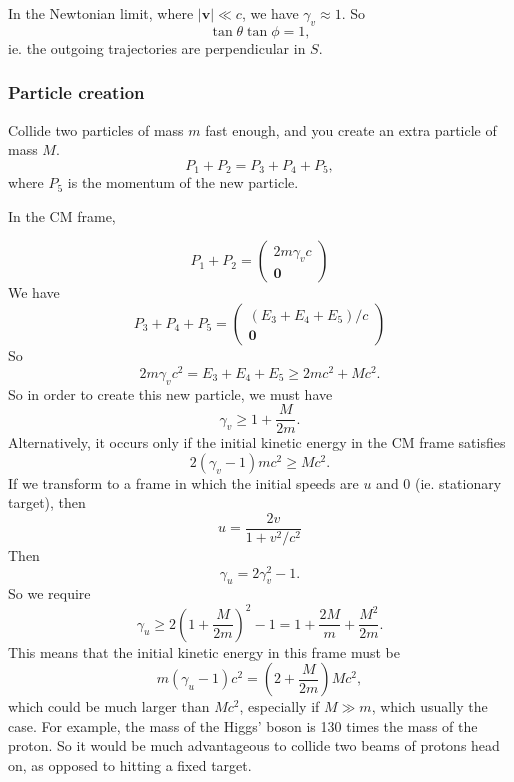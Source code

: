 \documentclass[a4paper]{article}
\begin{document}
In the Newtonian limit, where $|\mathbf{v}| \ll c$, we have $\gamma_v \approx 1$. So
\[
  \tan \theta\tan \phi = 1,
\]
ie. the outgoing trajectories are perpendicular in $S$.

\subsubsection*{Particle creation}
Collide two particles of mass $m$ fast enough, and you create an extra particle of mass $M$.
\[
  P_1 + P_2 = P_3 + P_4 + P_5,
\]
where $P_5$ is the momentum of the new particle.

In the CM frame, 
\begin{center}
\end{center}
\[
  P_1 + P_2 = 
  \begin{pmatrix}
    2m\gamma_v c\\
    \mathbf{0}
  \end{pmatrix}
\]
We have
\[
  P_3 + P_4 + P_5 = 
  \begin{pmatrix}
    (E_3 + E_4 + E_5)/c\\
    \mathbf{0}
  \end{pmatrix}
\]
So
\[
  2m\gamma_v c^2 = E_3 + E_4 + E_5 \geq 2mc^2 + Mc^2.
\]
So in order to create this new particle, we must have
\[
  \gamma_v \geq 1 + \frac{M}{2m}.
\]
Alternatively, it occurs only if the initial kinetic energy in the CM frame satisfies
\[
  2(\gamma_v - 1)mc^2 \geq Mc^2.
\]
If we transform to a frame in which the initial speeds are $u$ and 0 (ie. stationary target), then
\[
  u = \frac{2v}{1 + v^2/c^2}
\]
Then
\[
  \gamma_u = 2\gamma_v^2 - 1.
\]
So we require
\[
  \gamma_u \geq 2\left(1 + \frac{M}{2m}\right)^2 - 1 = 1 + \frac{2M}{m} + \frac{M^2}{2m}.
\]
This means that the initial kinetic energy in this frame must be
\[
  m(\gamma_u - 1)c^2  = \left(2 + \frac{M}{2m}\right)Mc^2,
\]
which could be much larger than $Mc^2$, especially if $M\gg m$, which usually the case. For example, the mass of the Higgs' boson is 130 times the mass of the proton. So it would be much advantageous to collide two beams of protons head on, as opposed to hitting a fixed target.
\end{document}
